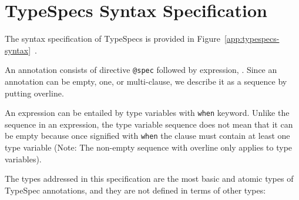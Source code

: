 \section{TypeSpecs Syntax Specification}



The syntax specification of TypeSpecs is provided in Figure~\ref{app:typespecs-syntax}~\cite{elixir-typespecs,erlang-typespecs}.

An annotation consists of directive \texttt{@spec} followed by expression, \TSE.
Since an annotation can be empty, one, or multi-clause, we describe it as a sequence by putting overline.

An expression can be entailed by type variables with \texttt{when} keyword.
Unlike the sequence in an expression, the type variable sequence does not mean that it can be empty because once signified with \texttt{when} the clause must contain at least one type variable (Note: The non-empty sequence with overline only applies to type variables).

The types addressed in this specification are the most basic and atomic types of TypeSpec annotations, and they are not defined in terms of other types:

